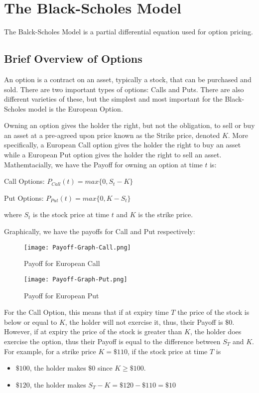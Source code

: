 \documentclass{report}
\begin{document}
\chapter{The Black-Scholes Model}

The Balck-Scholes Model is a partial differential equation used for option pricing. 


\section{Brief Overview of Options}

An option is a contract on an asset, typically a stock, that can be purchased and sold. There are two important types of options: Calls and Puts. There are also different varieties of these, but the simplest and most important for the Black-Scholes model is the European Option. 

Owning an option gives the holder the right, but not the obligation, to sell or buy an asset at a pre-agreed upon price known as the Strike price, denoted $K$. More specifically, a European Call option gives the holder the right to buy an asset while a European Put option gives the holder the right to sell an asset. 
Mathemtacially, we have the Payoff for owning an option at time $t$ is:

Call Options:
$P_{Call}(t)=max\{0, S_{t} - K\}$


Put Options:
$P_{Put}(t)=max\{0, K-S_{t}\}$

where $S_t$ is the stock price at time $t$ and $K$ is the strike price.

Graphically, we have the payoffs for Call and Put respectively:

\begin{figure}[H]
\centering
\texttt{[image: Payoff-Graph-Call.png]}
\centering
\caption{Payoff for European Call}
\label{fig:payoffCall}
\centering
\end{figure}

\begin{figure}[H]
\centering
\texttt{[image: Payoff-Graph-Put.png]}
\centering
\caption{Payoff for European Put}
\label{fig:payoffPut}
\centering
\end{figure}

For the Call Option, this means that if at expiry time $T$ the price of the stock is below or equal to $K$, the holder will not exercise it, thus, their Payoff is $\$0$. However, if at expiry the price of the stock is greater than $K$, the holder does exercise the option, thus their Payoff is equal to the difference between $S_T$ and $K$. For example, for a strike price $K = \$110$, if the stock price at time $T$ is 
\begin{itemize}
\item $\$100$, the holder makes $\$0$ since $K\geq\$100$.
\item $\$120$, the holder makes $S_T-K=\$120-\$110=\$10$
\end{itemize}
\end{document}
